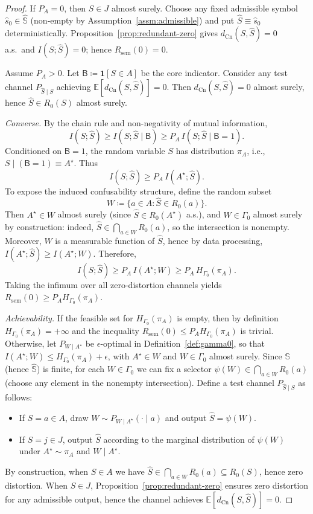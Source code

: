 \documentclass[twoside]{article}
\newcommand{\Cn}{\mathrm{Cn}}
\newcommand{\sem}{\mathrm{sem}}
\newcommand{\E}{\mathbb{E}}
\newcommand{\1}{\mathbf{1}}
\begin{document}
\begin{proof}
If \(P_A=0\), then \(S\in J\) almost surely.  Choose any fixed admissible symbol
\(\hat s_0\in\hat{\mathbb S}\) (non‑empty by Assumption~\ref{assm:admissible}) and
put \(\hat S\equiv \hat s_0\) deterministically.  Proposition~\ref{prop:redundant-zero}
gives \(d_{\Cn}(S,\hat S)=0\) a.s.\ and \(I(S;\hat S)=0\); hence \(R_{\sem}(0)=0\).

Assume \(P_A>0\). Let \(\mathsf{B}\coloneqq \1[S\in A]\) be the core indicator.
Consider any test channel \(P_{\hat{S}\mid S}\) achieving \(\E[d_{\Cn}(S,\hat{S})]=0\).
Then \(d_{\Cn}(S,\hat{S})=0\) almost surely, hence \(\hat{S}\in R_0(S)\) almost surely.

\emph{Converse.}
By the chain rule and non-negativity of mutual information,
\[
I(S;\hat{S}) \ge I(S;\hat{S}\mid \mathsf{B})
\ge P_A\, I(S;\hat{S}\mid \mathsf{B}=1).
\]
Conditioned on \(\mathsf{B}=1\), the random variable \(S\) has distribution \(\pi_A\), i.e., \(S\mid(\mathsf{B}=1)\equiv A^\star\).
Thus
\[
I(S;\hat{S}) \ge P_A\, I(A^\star;\hat{S}).
\]
To expose the induced confusability structure, define the random subset
\[
W \coloneqq \{a\in A : \hat{S}\in R_0(a)\}.
\]
Then \(A^\star\in W\) almost surely (since \(\hat{S}\in R_0(A^\star)\) a.s.), and \(W\in\Gamma_0\) almost surely by construction:
indeed, \(\hat{S}\in \bigcap_{a\in W} R_0(a)\), so the intersection is nonempty.
Moreover, \(W\) is a measurable function of \(\hat{S}\), hence by data processing,
\(I(A^\star;\hat{S}) \ge I(A^\star;W)\).
Therefore,
\[
I(S;\hat{S}) \ge P_A\, I(A^\star;W) \ge P_A\, H_{\Gamma_0}(\pi_A).
\]
Taking the infimum over all zero-distortion channels yields \(R_{\sem}(0)\ge P_A H_{\Gamma_0}(\pi_A)\).

\emph{Achievability.}
If the feasible set for \(H_{\Gamma_0}(\pi_A)\) is empty, then by definition
\(H_{\Gamma_0}(\pi_A)=+\infty\) and the inequality \(R_{\sem}(0)\le P_A H_{\Gamma_0}(\pi_A)\)
is trivial.  Otherwise, let \(P_{W\mid A^\star}\) be \(\epsilon\)-optimal in Definition~\ref{def:gamma0}, so that
\(I(A^\star;W)\le H_{\Gamma_0}(\pi_A)+\epsilon\), with \(A^\star\in W\) and \(W\in\Gamma_0\) almost surely.
Since \(\mathbb{S}\) (hence \(\hat{\mathbb{S}}\)) is finite, for each \(W\in\Gamma_0\) we can fix a selector
\(\psi(W)\in \bigcap_{a\in W}R_0(a)\) (choose any element in the nonempty intersection).
Define a test channel \(P_{\hat{S}\mid S}\) as follows:
\begin{itemize}
  \item If \(S=a\in A\), draw \(W\sim P_{W\mid A^\star}(\cdot\mid a)\) and output \(\hat{S}=\psi(W)\).
  \item If \(S=j\in J\), output \(\hat{S}\) according to the marginal distribution of \(\psi(W)\) under \(A^\star\sim\pi_A\) and \(W\mid A^\star\).
\end{itemize}
By construction, when \(S\in A\) we have \(\hat{S}\in \bigcap_{a\in W}R_0(a)\subseteq R_0(S)\), hence zero distortion.
When \(S\in J\), Proposition~\ref{prop:redundant-zero} ensures zero distortion for any admissible output, hence the channel achieves
\(\E[d_{\Cn}(S,\hat{S})]=0\).


\end{proof}
\end{document}

